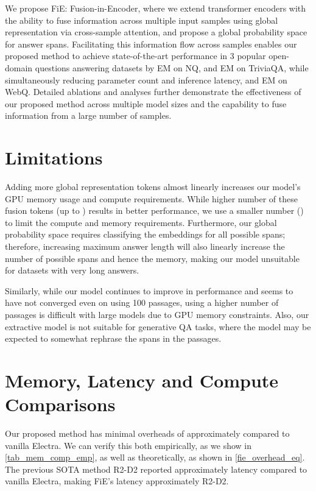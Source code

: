 \documentclass[11pt]{article}
\begin{document}
We propose FiE: Fusion-in-Encoder, where we extend transformer encoders with the ability to fuse information across multiple input samples using global representation via cross-sample attention, and propose a global probability space for answer spans. Facilitating this information flow across samples enables our proposed method to achieve state-of-the-art performance in 3 popular open-domain questions answering datasets by  EM on NQ, and  EM on TriviaQA, while simultaneously reducing parameter count and inference latency, and  EM on WebQ. Detailed ablations and analyses further demonstrate the effectiveness of our proposed method across multiple model sizes and the capability to fuse information from a large number of samples.

%
 \section*{Limitations}

Adding more global representation tokens almost linearly increases our model's GPU memory usage and compute requirements. While higher number of these fusion tokens (up to ) results in better performance, we use a smaller number () to limit the compute and memory requirements. Furthermore, our global probability space requires classifying the embeddings for all possible spans; therefore, increasing maximum answer length will also linearly increase the number of possible spans and hence the memory, making our model unsuitable for datasets with very long answers. 

Similarly, while our model continues to improve in performance and seems to have not converged even on using 100 passages, using a higher number of passages is difficult with large models due to GPU memory constraints. Also, our extractive model is not suitable for generative QA tasks, where the model may be expected to somewhat rephrase the spans in the passages. 



\appendix

\section{Memory, Latency and Compute Comparisons}
\label{mem_lat_comp}

Our proposed method has minimal overheads of approximately  compared to vanilla Electra. We can verify this both empirically, as we show in \cref{tab_mem_comp_emp}, as well as theoretically, as shown in \cref{fie_overhead_eq}. The previous SOTA method R2-D2 \cite{r2d2} reported approximately  latency compared to vanilla Electra, making FiE's latency approximately  R2-D2.
\end{document}

